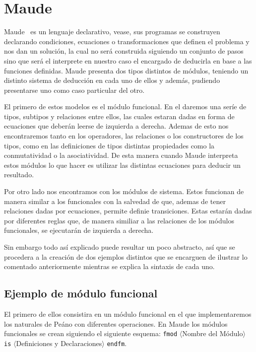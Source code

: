 
\section{Maude}

Maude~\cite{maudeBook} es un lenguaje declarativo, vease, sus programas se construyen declarando condiciones, ecuaciones o transformaciones que definen el problema y nos dan un solución, la cual no será construida siguiendo un conjunto de pasos sino que será el interprete en nuestro caso el encargado de deducirla en base a las funciones definidas. Maude presenta dos tipos distintos de módulos, teniendo un distinto sistema de deducción en cada uno de ellos y además, pudiendo presentarse uno como caso particular del otro.\par

El primero de estos modelos es el módulo funcional. En el daremos una seríe de tipos, subtipos y relaciones entre ellos, las cuales estaran dadas en forma de ecuaciones que deberán leerse de izquierda a derecha. Ademas de esto nos encontraremos tanto en los operadores, las relaciones o los constructores de los tipos, como en las definiciones de tipos distintas propiedades como la conmutatividad o la asociatividad. De esta manera cuando Maude interpreta estos módulos lo que hacer es utilizar las distintas ecuaciones para deducir un resultado.\par

Por otro lado nos encontramos con los módulos de sistema. Estos funcionan de manera similar a los funcionales con la salvedad de que, ademas de tener relaciones dadas por ecuaciones, permite definie transiciones. Estas estarán dadas por diferentes reglas que, de manera similiar a las relaciones de los módulos funcionales, se ejecutarán de izquierda a derecha.\par

Sin embargo todo así explicado puede resultar un poco abstracto, así que se procedera a la creación de dos ejemplos distintos que se encarguen de ilustrar lo comentado anteriormente mientras se explica la sintaxis de cada uno. \par

\subsection{Ejemplo de módulo funcional}

El primero de ellos consistira en un módulo funcional en el que implementaremos los naturales de Peáno con diferentes operaciones. En Maude los módulos funcionales se crean siguiendo el siguiente esquema: \texttt{fmod} $\langle$Nombre del Módulo$\rangle$ \texttt{is} $\langle$Definiciones y Declaraciones$\rangle$ \texttt{endfm}.\par

